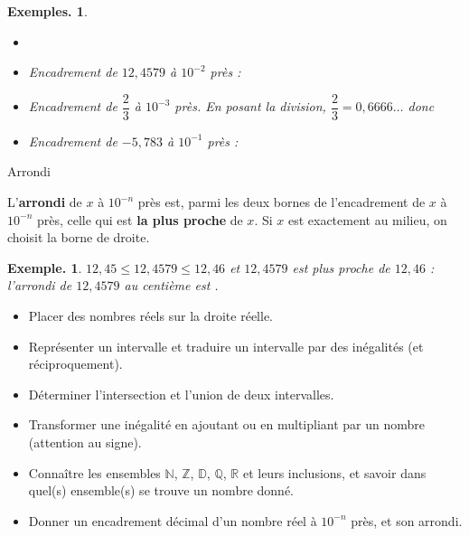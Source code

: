 \documentclass[12pt]{article}
\theoremstyle{break}
\newtheorem*{example}{Exemple.}
\newtheorem*{examples}{Exemples.}
\begin{document}
\begin{examples}
  \begin{itemize}
    \item[]
    \item Encadrement de $12{,}4579$ à $10^{-2}$ près : 
    \item Encadrement de $\dfrac{2}{3}$ à $10^{-3}$ près. En posant la division, $\dfrac{2}{3} = 0{,}6666\ldots$ donc 
    \item Encadrement de $-5{,}783$ à $10^{-1}$ près : 

  \end{itemize}
\end{examples}

\vfill

\begin{definition}{Arrondi}{}
  \begin{multihide}
  L'\textbf{arrondi} de $x$ à $10^{-n}$ près est, parmi les deux bornes de l'encadrement de $x$ à $10^{-n}$ près, celle qui est \textbf{la plus proche} de $x$. Si $x$ est exactement au milieu, on choisit la borne de droite.
  \end{multihide}
\end{definition}

\begin{example}
  $12{,}45 \leq 12{,}4579 \leq 12{,}46$ et $12{,}4579$ est plus proche de $12{,}46$ : l'arrondi de $12{,}4579$ au centième est .
\end{example}

\vspace{2em}

\begin{savoir}{}{}
  \begin{itemize}[label=--]
    \item Placer des nombres réels sur la droite réelle.
    \item Représenter un intervalle et traduire un intervalle par des inégalités (et réciproquement).
    \item Déterminer l'intersection et l'union de deux intervalles.
    \item Transformer une inégalité en ajoutant ou en multipliant par un nombre (attention au signe).
    \item Connaître les ensembles $\mathbb{N}$, $\mathbb{Z}$, $\mathbb{D}$, $\mathbb{Q}$, $\mathbb{R}$ et leurs inclusions, et savoir dans quel(s) ensemble(s) se trouve un nombre donné.
    \item Donner un encadrement décimal d'un nombre réel à $10^{-n}$ près, et son arrondi.
  \end{itemize}
\end{savoir}

\vfill
\end{document}
